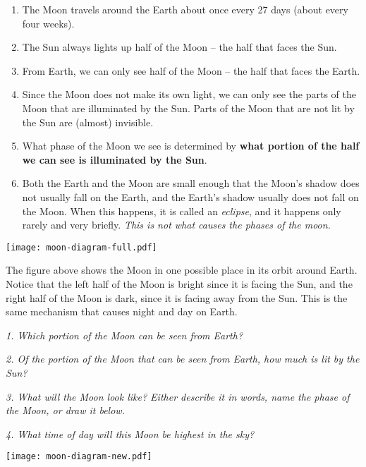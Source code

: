 \documentclass[11pt]{article}
\begin{document}
\begin{enumerate}
\item The Moon travels around the Earth about once every 27 days (about every four weeks).
\item The Sun always lights up half of the Moon -- the half that faces the Sun.
\item From Earth, we can only see half of the Moon -- the half that faces the Earth.
\item Since the Moon does not make its own light, we can only see the parts of the Moon that are illuminated by the Sun. Parts of the Moon that are not lit by the Sun are (almost) invisible.
\item What phase of the Moon we see is determined by {\bf what portion of the half we can see is illuminated by the Sun}.
\item Both the Earth and the Moon are small enough that the Moon's shadow does not usually fall on the Earth, and the Earth's
shadow usually does not fall on the Moon. When this happens, it is called an {\it eclipse}, and it happens only rarely and very 
briefly. {\it This is not what causes the phases of the moon.}
\end{enumerate}

\newpage
\texttt{[image: moon-diagram-full.pdf]}


	The figure above shows the Moon in one possible place in its orbit around Earth. Notice that the left half of the Moon is
	bright since it is facing the Sun, and the right half of the Moon is dark, since it is facing away from the Sun. This is the same mechanism that causes night and day on Earth.

{\it 1. Which portion of the Moon can be seen from Earth? }

\vspace{0.8in}

{\it 2. Of the portion of the Moon that can be seen from Earth, how much is lit by the Sun?}

\vspace{0.8in}

{\it 3. What will the Moon look like? Either describe it in words, name the phase of the Moon, or draw it below.}
	
	\vspace{1.2in}
	
{\it 4. What time of day will this Moon be highest in the sky?}
\newpage

\newpage
\texttt{[image: moon-diagram-new.pdf]}
\end{document}
